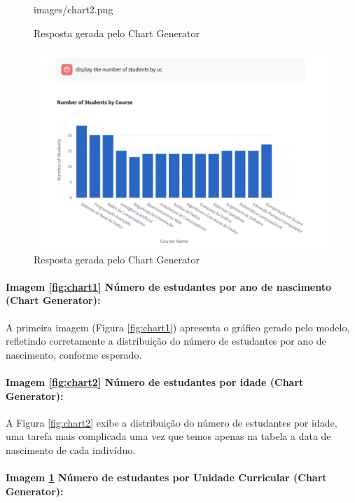 \documentclass{article}
\begin{document}
\begin{figure}[ht]
\begin{minipage}{0.3\linewidth}
        {images/chart2.png}
        \caption{Resposta gerada pelo Chart Generator}
        \label{fig:chart2}
    \end{minipage}
    \hspace{0.01\linewidth} %
    \begin{minipage}{0.3\linewidth}
        \centering
        \includegraphics[width=\linewidth]
        {images/chart3.png}
        \caption{Resposta gerada pelo Chart Generator}
        \label{fig:chart3}
    \end{minipage}
\end{figure}

\paragraph{Imagem \ref{fig:chart1} Número de estudantes por ano de nascimento (Chart Generator):}

A primeira imagem (Figura \ref{fig:chart1}) apresenta o gráfico gerado pelo modelo, refletindo corretamente a distribuição do número de estudantes por ano de nascimento, conforme esperado.

\paragraph{Imagem \ref{fig:chart2} Número de estudantes por idade (Chart Generator):}

A Figura \ref{fig:chart2} exibe a distribuição do número de estudantes por idade, uma tarefa mais complicada uma vez que temos apenas na tabela a data de nascimento de cada indivíduo.

\paragraph{Imagem \ref{fig:chart3} Número de estudantes por Unidade Curricular (Chart Generator):}
\end{document}

